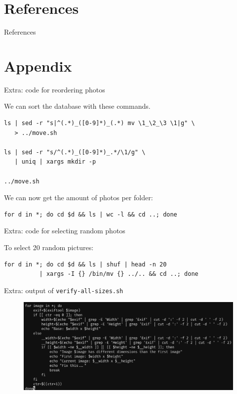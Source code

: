 \section{References}

\begin{frame}{References}
    
    
\end{frame}

\section{Appendix}

\begin{frame}[fragile]{Extra: code for reordering photos}

    We can sort the database with these commands.

    \begin{lstlisting}
ls | sed -r "s|^(.*)_([0-9]*)_(.*) mv \1_\2_\3 \1|g" \
   > ../move.sh
    
ls | sed -r "s/^(.*)_([0-9]*)_.*/\1/g" \
   | uniq | xargs mkdir -p
   
../move.sh
    \end{lstlisting}
    
    \medskip

    We can now get the amount of photos per folder:

    \medskip
    
    \begin{lstlisting}
for d in *; do cd $d && ls | wc -l && cd ..; done
    \end{lstlisting}

\end{frame}
\begin{frame}[fragile]{Extra: code for selecting random photos}

    To select 20 random pictures:
    
    \medskip
    
    \begin{lstlisting}
for d in *; do cd $d && ls | shuf | head -n 20 
          | xargs -I {} /bin/mv {} ../.. && cd ..; done
    \end{lstlisting}
\end{frame}

\begin{frame}{Extra: output of \texttt{verify-all-sizes.sh}}
    
    \begin{figure}
        \centering
        \includegraphics[width=\textwidth]{../drawable/screenshot-verifysizes.png}
    \end{figure}
    
\end{frame}